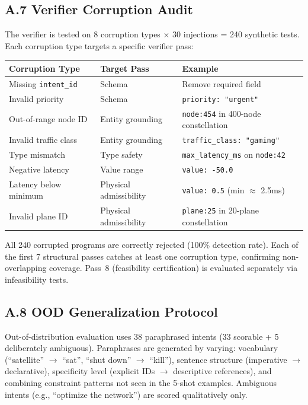\subsection*{A.7 Verifier Corruption Audit}

The verifier is tested on 8 corruption types $\times$ 30 injections
= 240 synthetic tests. Each corruption type targets a specific
verifier pass:

\begin{table}[h]
\centering
\small
\begin{tabular}{lll}
\toprule
\textbf{Corruption Type} & \textbf{Target Pass} & \textbf{Example} \\
\midrule
Missing \texttt{intent\_id} & Schema & Remove required field \\
Invalid priority & Schema & \texttt{priority: "urgent"} \\
Out-of-range node ID & Entity grounding & \texttt{node:454} in 400-node constellation \\
Invalid traffic class & Entity grounding & \texttt{traffic\_class: "gaming"} \\
Type mismatch & Type safety & \texttt{max\_latency\_ms} on \texttt{node:42} \\
Negative latency & Value range & \texttt{value: -50.0} \\
Latency below minimum & Physical admissibility & \texttt{value: 0.5} (min $\approx$ 2.5ms) \\
Invalid plane ID & Physical admissibility & \texttt{plane:25} in 20-plane constellation \\
\bottomrule
\end{tabular}
\end{table}

\noindent All 240 corrupted programs are correctly rejected (100\%
detection rate). Each of the first 7 structural passes catches at least one
corruption type, confirming non-overlapping coverage. Pass~8 (feasibility
certification) is evaluated separately via infeasibility tests.

\subsection*{A.8 OOD Generalization Protocol}

Out-of-distribution evaluation uses 38 paraphrased intents (33 scorable
+ 5 deliberately ambiguous). Paraphrases are generated by varying:
vocabulary (``satellite'' $\to$ ``sat'', ``shut down'' $\to$ ``kill''),
sentence structure (imperative $\to$ declarative), specificity level
(explicit IDs $\to$ descriptive references), and combining constraint
patterns not seen in the 5-shot examples. Ambiguous intents (e.g.,
``optimize the network'') are scored qualitatively only.

